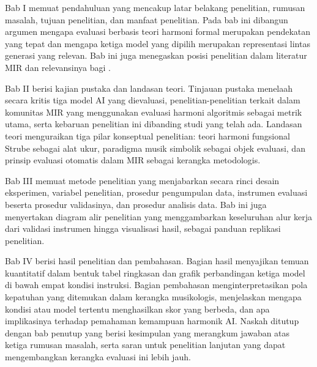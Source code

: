 Bab I memuat pendahuluan yang mencakup latar belakang penelitian, rumusan masalah, tujuan penelitian, dan manfaat penelitian. Pada bab ini dibangun argumen mengapa evaluasi berbasis teori harmoni formal merupakan pendekatan yang tepat dan mengapa ketiga model yang dipilih merupakan representasi lintas generasi yang relevan. Bab ini juga menegaskan posisi penelitian dalam literatur MIR dan relevansinya bagi \programstudy{} \institutionname{}.

Bab II berisi kajian pustaka dan landasan teori. Tinjauan pustaka menelaah secara kritis tiga model AI yang dievaluasi, penelitian-penelitian terkait dalam komunitas MIR yang menggunakan evaluasi harmoni algoritmis sebagai metrik utama, serta kebaruan penelitian ini dibanding studi yang telah ada. Landasan teori menguraikan tiga pilar konseptual penelitian: teori harmoni fungsional Strube sebagai alat ukur, paradigma musik simbolik sebagai objek evaluasi, dan prinsip evaluasi otomatis dalam MIR sebagai kerangka metodologis.

Bab III memuat metode penelitian yang menjabarkan secara rinci desain eksperimen, variabel penelitian, prosedur pengumpulan data, instrumen evaluasi beserta prosedur validasinya, dan prosedur analisis data. Bab ini juga menyertakan diagram alir penelitian yang menggambarkan keseluruhan alur kerja dari validasi instrumen hingga visualisasi hasil, sebagai panduan replikasi penelitian.

Bab IV berisi hasil penelitian dan pembahasan. Bagian hasil menyajikan temuan kuantitatif dalam bentuk tabel ringkasan dan grafik perbandingan ketiga model di bawah empat kondisi instruksi. Bagian pembahasan menginterpretasikan pola kepatuhan yang ditemukan dalam kerangka musikologis, menjelaskan mengapa kondisi atau model tertentu menghasilkan skor yang berbeda, dan apa implikasinya terhadap pemahaman kemampuan harmonik AI. Naskah ditutup dengan bab penutup yang berisi kesimpulan yang merangkum jawaban atas ketiga rumusan masalah, serta saran untuk penelitian lanjutan yang dapat mengembangkan kerangka evaluasi ini lebih jauh.
